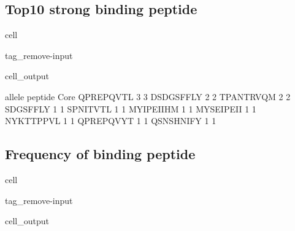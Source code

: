 \documentclass[letterpaper,10pt,english]{jupyterBook}
\begin{document}
\subsection{Top10 strong binding peptide}
\label{\detokenize{ipynb/chapter2:top10-strong-binding-peptide}}
\begin{sphinxuseclass}{cell}
\begin{sphinxuseclass}{tag_remove-input}\begin{sphinxVerbatimOutput}

\begin{sphinxuseclass}{cell_output}
\begin{sphinxVerbatim}[commandchars=\\\{\}]
           allele  peptide
Core                      
QPREPQVTL       3        3
DSDGSFFLY       2        2
TPANTRVQM       2        2
\PYGZhy{}SDGSFFLY       1        1
SPN\PYGZhy{}ITVTL       1        1
MYIPEIIHM       1        1
MYSEIPEII       1        1
NYKTTPPVL       1        1
QPREPQVYT       1        1
QSNSHNIFY       1        1
\end{sphinxVerbatim}

\end{sphinxuseclass}\end{sphinxVerbatimOutput}

\end{sphinxuseclass}
\end{sphinxuseclass}

\subsection{Frequency of binding peptide}
\label{\detokenize{ipynb/chapter2:frequency-of-binding-peptide}}
\begin{sphinxuseclass}{cell}
\begin{sphinxuseclass}{tag_remove-input}\begin{sphinxVerbatimOutput}

\begin{sphinxuseclass}{cell_output}
\noindent{}

\end{sphinxuseclass}\end{sphinxVerbatimOutput}

\end{sphinxuseclass}
\end{sphinxuseclass}
\end{document}
